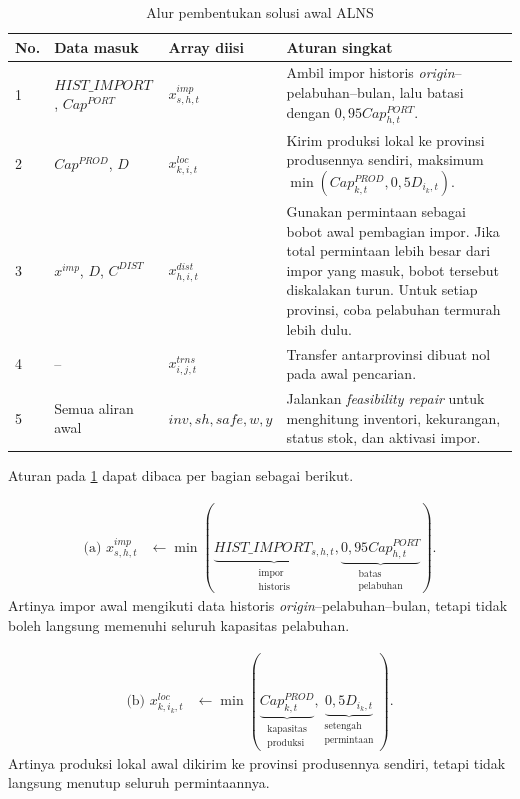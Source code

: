 \documentclass{file/TA-ITS}
\theoremstyle{definition}
\theoremstyle{definition}
\theoremstyle{plain}
\begin{document}
\begin{table}[H]
\centering
\caption{Alur pembentukan solusi awal ALNS}
\label{tab:initial_solution_construction}
\scriptsize
\renewcommand{\arraystretch}{1.5}
\begin{tabularx}{\textwidth}{@{}p{}p{}p{}X@{}}
\toprule
\textbf{No.} & \textbf{Data masuk} & \textbf{Array diisi} & \textbf{Aturan singkat} \\
\midrule
1 & $HIST\_IMPORT$, $Cap^{PORT}$ & $x^{imp}_{s,h,t}$ & Ambil impor historis \textit{origin}--pelabuhan--bulan, lalu batasi dengan $0{,}95Cap^{PORT}_{h,t}$. \\
2 & $Cap^{PROD}$, $D$ & $x^{loc}_{k,i,t}$ & Kirim produksi lokal ke provinsi produsennya sendiri, maksimum $\min(Cap^{PROD}_{k,t},0{,}5D_{i_k,t})$. \\
3 & $x^{imp}$, $D$, $C^{DIST}$ & $x^{dist}_{h,i,t}$ & Gunakan permintaan sebagai bobot awal pembagian impor. Jika total permintaan lebih besar dari impor yang masuk, bobot tersebut diskalakan turun. Untuk setiap provinsi, coba pelabuhan termurah lebih dulu. \\
4 & -- & $x^{trns}_{i,j,t}$ & Transfer antarprovinsi dibuat nol pada awal pencarian. \\
5 & Semua aliran awal & $inv,sh,safe,w,y$ & Jalankan \textit{feasibility repair} untuk menghitung inventori, kekurangan, status stok, dan aktivasi impor. \\
\bottomrule
\end{tabularx}
\renewcommand{\arraystretch}{1}
\end{table}

Aturan pada \ref{tab:initial_solution_construction} dapat dibaca per bagian sebagai berikut.

\[
\begin{aligned}
\text{(a) } x^{imp}_{s,h,t}
&\leftarrow
\min\left(
\underbrace{HIST\_IMPORT_{s,h,t}}_{\substack{\text{impor}\\\text{historis}}},
\underbrace{0{,}95Cap^{PORT}_{h,t}}_{\substack{\text{batas}\\\text{pelabuhan}}}
\right).
\end{aligned}
\]
\noindent Artinya impor awal mengikuti data historis \textit{origin}--pelabuhan--bulan, tetapi tidak boleh langsung memenuhi seluruh kapasitas pelabuhan.

\[
\begin{aligned}
\text{(b) } x^{loc}_{k,i_k,t}
&\leftarrow
\min\left(
\underbrace{Cap^{PROD}_{k,t}}_{\substack{\text{kapasitas}\\\text{produksi}}},
\underbrace{0{,}5D_{i_k,t}}_{\substack{\text{setengah}\\\text{permintaan}}}
\right).
\end{aligned}
\]
\noindent Artinya produksi lokal awal dikirim ke provinsi produsennya sendiri, tetapi tidak langsung menutup seluruh permintaannya.
\end{document}
